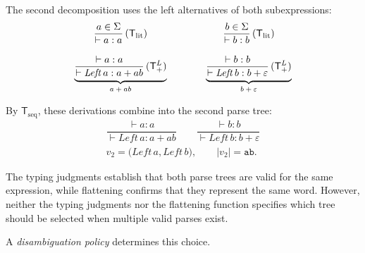 The second decomposition uses the left alternatives of both subexpressions:
\[
\begin{array}{c@{\qquad\qquad}c}
\underbrace{
\begin{gathered}
\dfrac{a \in \Sigma}{\vdash a : a}
\,(\mathsf{T}_{\mathrm{lit}})
\\[1em]
\dfrac{\vdash a : a}
      {\vdash \mathit{Left}\,a : a+ab}
\,(\mathsf{T}_{+}^{L})
\end{gathered}
}_{\text{$a+ab$}}
&
\underbrace{
\begin{gathered}
\dfrac{b \in \Sigma}{\vdash b : b}
\,(\mathsf{T}_{\mathrm{lit}})
\\[1em]
\dfrac{\vdash b : b}
      {\vdash \mathit{Left}\,b : b+\varepsilon}
\,(\mathsf{T}_{+}^{L})
\end{gathered}
}_{\text{$b+\varepsilon$}}
\end{array}
\]

By $\mathsf{T}_{\mathrm{seq}}$, these derivations combine into the second parse tree:
\begin{equation}
\label{eq:decomposition-left}
\begin{gathered}
\dfrac{\vdash a : a}
      {\vdash \mathit{Left}\,a : a+ab}
\qquad
\dfrac{\vdash b : b}
      {\vdash \mathit{Left}\,b : b+\varepsilon}
\\[1em]
v_2 =
\bigl(\mathit{Left}\,a,\mathit{Left}\,b\bigr),
\qquad
|v_2| = \mathtt{ab}.
\end{gathered}
\end{equation}

The typing judgments establish
that both parse trees are valid for the same expression, 
while flattening confirms that they represent the same word. 
However, neither the typing judgments 
nor the flattening function specifies which tree should be selected 
when multiple valid parses exist. 

A \emph{disambiguation policy} determines this choice.